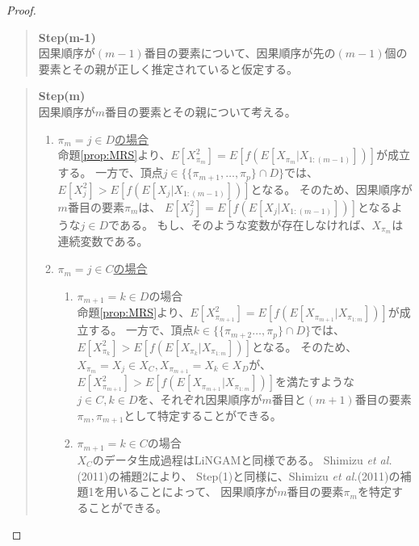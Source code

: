 \begin{proof}
\begin{quote}
\begin{enumerate}[label=(\roman*)]
\begin{enumerate}[label=(ii - \alph*)]
      \end{enumerate}

    \end{enumerate}
  \end{quote}

  \begin{quote}
    \textbf{Step(m-1)} \\
    因果順序が$(m-1)$番目の要素について、因果順序が先の$(m-1)$個の要素とその親が正しく推定されていると仮定する。
  \end{quote}

  \begin{quote}
    \textbf{Step(m)} \\
    因果順序が$m$番目の要素とその親について考える。
    \begin{enumerate}[label=(\roman*)]
      \item
      \underline{$\pi_m = j \in D$の場合} \\
      命題\ref{prop:MRS}より、$E[X_{\pi_m}^2] = E[f(E[X_{\pi_m} | X_{1:(m-1)}])]$が成立する。
      一方で、頂点$j \in \{\{ \pi_{m+1}, \dots, \pi_p\} \cap D\}$では、
      $E[X_j^2] > E[f(E[X_j | X_{1:(m-1)}])]$となる。
      そのため、因果順序が$m$番目の要素$\pi_m$は、
      $E[X_j^2] = E[f(E[X_j | X_{1:(m-1)}])]$となるような$j \in D$である。
      もし、そのような変数が存在しなければ、$X_{\pi_m}$は連続変数である。

      \item
      \underline{$\pi_m = j \in C$の場合}
      \begin{enumerate}[label=(ii - \alph*)]
        \item
        $\pi_{m+1} = k \in D$の場合 \\
        命題\ref{prop:MRS}より、$E[X_{\pi_{m+1}}^2] = E[f(E[X_{\pi_{m+1}} | X_{\pi_{1:m}}])]$が成立する。
        一方で、頂点$k \in \{\{ \pi_{m+2} \dots, \pi_{p} \} \cap D\}$では、
        $E[X_{\pi_{k}}^2] > E[f(E[X_{\pi_{k}} | X_{\pi_{1:m}}])]$となる。
        そのため、$X_{\pi_m} = X_j \in X_C, X_{\pi_{m+1}} = X_k \in X_D$が、
        $E[X_{\pi_{m+1}}^2] > E[f(E[X_{\pi_{m+1}} | X_{\pi_{1:m}}])]$を満たすような
        $j \in C, k \in D$を、それぞれ因果順序が$m$番目と$(m+1)$番目の要素
        $\pi_{m}, \pi_{m+1}$として特定することができる。

        \item
        $\pi_{m+1} = k \in C$の場合 \\
        $X_C$のデータ生成過程はLiNGAM\cite{Shimizu2006-yu}と同様である。
        Shimizu \textit{et al.}(2011)\cite{Shimizu2011-pd}の補題2により、
        Step(1)と同様に、Shimizu \textit{et al.}(2011)\cite{Shimizu2011-pd}の補題1を用いることによって、
        因果順序が$m$番目の要素$\pi_m$を特定することができる。


\end{enumerate}
\end{enumerate}
\end{quote}
\end{proof}
